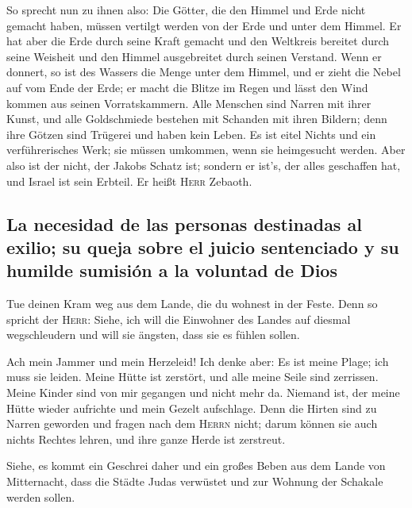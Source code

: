  So sprecht nun zu ihnen also: Die Götter, die den Himmel
und Erde nicht gemacht haben, müssen vertilgt werden von der Erde und
unter dem Himmel.  Er hat aber die Erde durch seine Kraft
gemacht und den Weltkreis bereitet durch seine Weisheit und den Himmel
ausgebreitet durch seinen Verstand.  Wenn er donnert, so
ist des Wassers die Menge unter dem Himmel, und er zieht die Nebel auf
vom Ende der Erde; er macht die Blitze im Regen und lässt den Wind
kommen aus seinen Vorratskammern.  Alle Menschen sind
Narren mit ihrer Kunst, und alle Goldschmiede bestehen mit Schanden mit
ihren Bildern; denn ihre Götzen sind Trügerei und haben kein Leben.
 Es ist eitel Nichts und ein verführerisches Werk; sie
müssen umkommen, wenn sie heimgesucht werden.  Aber also
ist der nicht, der Jakobs Schatz ist; sondern er ist's, der alles
geschaffen hat, und Israel ist sein Erbteil. Er heißt \textsc{Herr}
Zebaoth.

\hypertarget{la-necesidad-de-las-personas-destinadas-al-exilio-su-queja-sobre-el-juicio-sentenciado-y-su-humilde-sumisiuxf3n-a-la-voluntad-de-dios}{%
\subsection{La necesidad de las personas destinadas al exilio; su queja
sobre el juicio sentenciado y su humilde sumisión a la voluntad de
Dios}\label{la-necesidad-de-las-personas-destinadas-al-exilio-su-queja-sobre-el-juicio-sentenciado-y-su-humilde-sumisiuxf3n-a-la-voluntad-de-dios}}

 Tue deinen Kram weg aus dem Lande, die du wohnest in der
Feste.  Denn so spricht der \textsc{Herr}: Siehe, ich
will die Einwohner des Landes auf diesmal wegschleudern und will sie
ängsten, dass sie es fühlen sollen.

 Ach mein Jammer und mein Herzeleid! Ich denke aber: Es
ist meine Plage; ich muss sie leiden.  Meine Hütte ist
zerstört, und alle meine Seile sind zerrissen. Meine Kinder sind von mir
gegangen und nicht mehr da. Niemand ist, der meine Hütte wieder
aufrichte und mein Gezelt aufschlage.  Denn die Hirten
sind zu Narren geworden und fragen nach dem \textsc{Herrn} nicht; darum
können sie auch nichts Rechtes lehren, und ihre ganze Herde ist
zerstreut.

 Siehe, es kommt ein Geschrei daher und ein großes Beben
aus dem Lande von Mitternacht, dass die Städte Judas verwüstet und zur
Wohnung der Schakale werden sollen.

